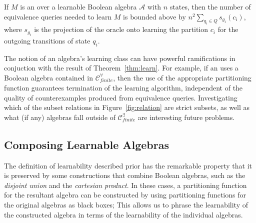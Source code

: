 \begin{theorem}\label{thm:learn}
    If $M$ is an \SFA over a learnable Boolean algebra $\mathcal{A}$ with $n$ states,
    then the number of equivalence queries
    needed to learn $M$ is bounded above by $n^2 \sum_{q_i \in Q} s_{g_i}(c_i)$,
    where $s_{g_i}$ is the projection of the oracle
    onto learning the partition $c_i$
    for the outgoing transitions of state $q_i$.
\end{theorem}

The notion of an algebra's learning class can have powerful ramifications
in conjuction with the result of Theorem~\ref{thm:learn}.
For example, if an \SFA uses a Boolean algebra contained
in $\mathcal{C}_\textit{finite}^\forall$, then the use
of the appropriate partitioning function guarantees termination
of the learning algorithm, independent of the quality of counterexamples
produced from equivalence queries.
Investigating which of the subset relations in Figure~\ref{fig:relation}
are strict subsets, as well as what (if any) algebras fall outside
of $\mathcal{C}_\textit{finite}^\exists$ are interesting
future problems.

\subsection{Composing Learnable Algebras}\label{sec:comp}

The definition of learnability described prior has
the remarkable property that it is preserved by some 
constructions that combine Boolean algebras,
such as the \emph{disjoint union} and the \emph{cartesian product}.
In these cases, a partitioning function for the 
resultant algebra can be constructed by using partitioning
functions for the original algebras as black boxes;
This allows us to phrase
the learnability of the constructed algebra
in terms of the learnability of the individual algebras.

